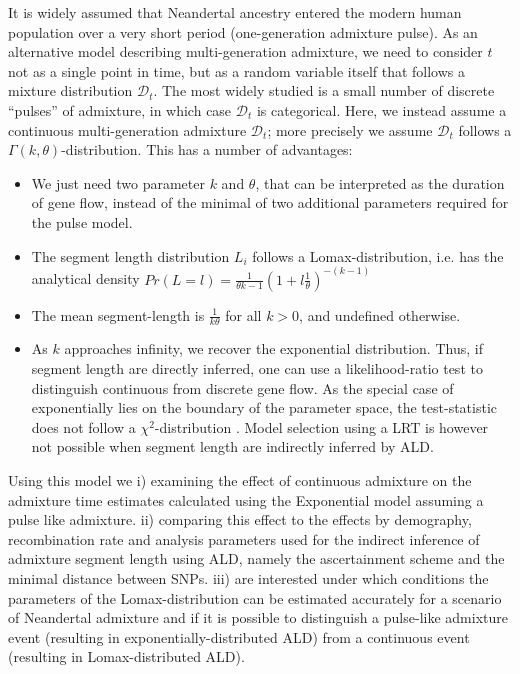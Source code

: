 \documentclass[]{article}
\begin{document}
It is widely assumed that Neandertal ancestry entered the modern human
population over a very short period (one-generation admixture pulse). As an alternative model describing multi-generation admixture, we need to
consider \(t\) not as a single point in time, but as a random variable
itself that follows a mixture distribution \(\mathcal{D}_t\). The most
widely studied is a small number of discrete ``pulses'' of admixture, in
which case \(\mathcal{D}_t\) is categorical. Here, we instead assume a
continuous multi-generation admixture \(\mathcal{D}_t\); more precisely we assume \(\mathcal{D}_t\)
follows a \(\Gamma(k, \theta)\)-distribution. This has a number of
advantages:

\begin{itemize}
    \item We just need two parameter $k$ and $\theta$, that can be interpreted as the duration of gene flow, instead of the minimal of two additional parameters required for the pulse model.
    \item The segment length distribution $L_i$ follows a Lomax-distribution, i.e. has the analytical density $Pr(L=l) = \frac{1}{\theta k-1} (1+l\frac{1}{\theta})^{-(k-1)}$
    \item The mean segment-length is  $\frac{1}{k \theta}$ for all $k > 0$, and undefined otherwise. 
    \item As $k$ approaches infinity, we recover the exponential distribution. Thus, if segment length are directly inferred, one can use a likelihood-ratio test to distinguish continuous from discrete gene flow. As the special case of exponentially lies on the boundary of the parameter space, the test-statistic does not follow a $\chi^2$-distribution \citep{Kozubowski_Testing_2008}. Model selection using a LRT is however not possible when segment length are indirectly inferred by ALD.
\end{itemize}

Using this model we i) examining the effect of continuous admixture on
the admixture time estimates calculated using the Exponential model
assuming a pulse like admixture. ii) comparing this effect to the
effects by demography, recombination rate and analysis parameters used
for the indirect inference of admixture segment length using ALD, namely
the ascertainment scheme and the minimal distance between SNPs. iii) are
interested under which conditions the parameters of the
Lomax-distribution can be estimated accurately for a scenario of
Neandertal admixture and if it is possible to distinguish a pulse-like
admixture event (resulting in exponentially-distributed ALD)
from a continuous event (resulting in Lomax-distributed ALD).
\end{document}
